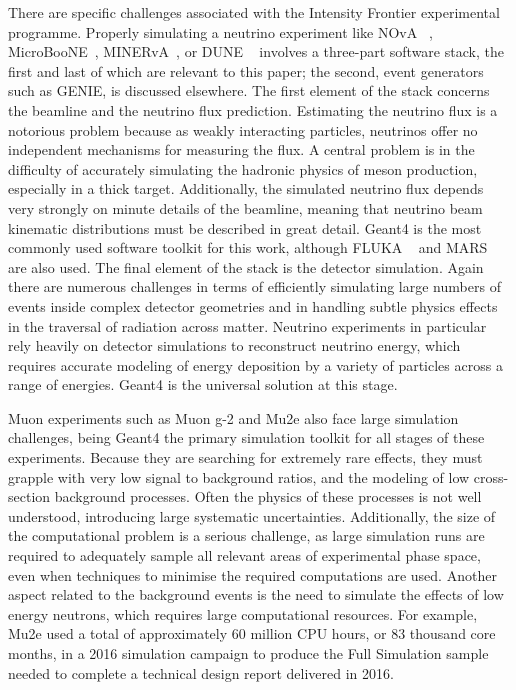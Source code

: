 \documentclass[12pt,a4paper]{article}
\begin{document}
There are specific challenges associated with the Intensity Frontier
experimental programme. Properly simulating a neutrino experiment like
NOvA ~\cite{Adamson:2016tbq}, MicroBooNE~\cite{MicroBooNE}, 
MINERvA~\cite{Aliaga:2013uqz}, or DUNE ~\cite{Acciarri:2015uup}
involves a three-part software stack, the first and last of which are
relevant to this paper; the second, event generators such as GENIE, 
is discussed elsewhere. The first element of the stack concerns
the beamline and the neutrino flux prediction. Estimating the neutrino
flux is a notorious problem because as weakly interacting particles,
neutrinos offer no independent mechanisms for measuring the flux. A
central problem is in the difficulty of accurately simulating the
hadronic physics of meson production, especially in a thick target.
Additionally, the simulated neutrino flux depends very strongly on
minute details of the beamline, meaning that neutrino beam kinematic
distributions must be described in great detail. Geant4 is the most
commonly used software toolkit for this work, although FLUKA ~\cite{Ferrari:2005zk} 
and MARS ~\cite{MARS} are also used. The final element of the stack is the
detector simulation. Again there are numerous challenges in terms of
efficiently simulating large numbers of events inside complex detector
geometries and in handling subtle physics effects in the traversal of
radiation across matter. Neutrino experiments in particular rely heavily
on detector simulations to reconstruct neutrino energy, which requires
accurate modeling of energy deposition by a variety of particles across
a range of energies. Geant4 is the universal solution at this stage.

Muon experiments such as Muon g-2 and Mu2e also face large simulation
challenges, being Geant4 the primary simulation toolkit for
all stages of these experiments. Because they are searching for extremely rare effects, they
must grapple with very low signal to background ratios, and the modeling
of low cross-section background processes. Often the physics of these
processes is not well understood, introducing large systematic
uncertainties. Additionally, the size of the computational problem is a
serious challenge, as large simulation runs are required to adequately
sample all relevant areas of experimental phase space, even when
techniques to minimise the required computations are used. Another
aspect related to the background events is the need to simulate the
effects of low energy neutrons, which requires large computational
resources. For example, Mu2e used a total of approximately 60 million
CPU hours, or 83 thousand core months, in a 2016 simulation campaign to
produce the Full Simulation sample needed to complete a technical design
report delivered in 2016. 
\end{document}

